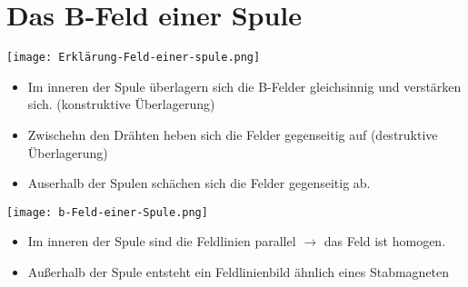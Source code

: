 \documentclass{article}
\begin{document}
\section*{Das B-Feld einer Spule}

\texttt{[image: Erklärung-Feld-einer-spule.png]}

\begin{itemize}
\item Im inneren der Spule überlagern sich die B-Felder gleichsinnig und verstärken sich. (konstruktive Überlagerung)
\item Zwischehn den Drähten heben sich die Felder gegenseitig auf (destruktive Überlagerung)
\item Auserhalb der Spulen schächen sich die Felder gegenseitig ab.
\end{itemize}

\texttt{[image: b-Feld-einer-Spule.png]}

\begin{itemize}
\item Im inneren der Spule sind die Feldlinien parallel $\rightarrow$ das Feld ist homogen.
\item Außerhalb der Spule entsteht ein Feldlinienbild ähnlich eines Stabmagneten
\end{itemize}
\end{document}
